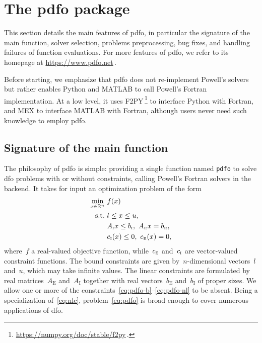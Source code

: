 \documentclass[manuscript,screen,review]{acmart}
\numberwithin{equation}{section}
\newcommand*{\R}{\mathbb{R}}
\newcommand*{\aeq}{A_{\scriptscriptstyle\text{E}}}
\newcommand*{\aub}{A_{\scriptscriptstyle\text{I}}}
\newcommand*{\beq}{b_{\scriptscriptstyle\text{E}}}
\newcommand*{\bub}{b_{\scriptscriptstyle\text{I}}}
\newcommand*{\ceq}{\con[\scriptscriptstyle\text{E}]}
\newcommand*{\con}[1][i]{c\ifthenelse{\equal{#1}{}}{}{_{#1}}}
\newcommand*{\cub}{\con[\scriptscriptstyle\text{I}]}
\newcommand*{\obj}{f}
\newcommand*{\pdfofun}{\texttt{pdfo}\xspace}
\newcommand*{\st}{\text{s.t.}}
\newcommand*{\xl}{l}
\newcommand*{\xu}{u}
\begin{document}
\section{The \gls{pdfo} package}
\label{sec:pdfo}

This section details the main features of \gls{pdfo}, in particular the signature of the main function, solver selection, problems preprocessing, bug fixes, and handling failures of function evaluations.
For more features of \gls{pdfo}, we refer to its homepage at \url{https://www.pdfo.net}\,.

Before starting, we emphasize that \gls{pdfo} does not re-implement Powell's solvers but rather enables Python and MATLAB to call Powell's Fortran implementation.
At a low level, it uses F2PY\,\footnote{\url{https://numpy.org/doc/stable/f2py}\,.} to interface Python with Fortran, and MEX to interface MATLAB with Fortran, although users never need such knowledge to employ \gls{pdfo}.

\subsection{Signature of the main function}

The philosophy of \gls{pdfo} is simple: providing a single function named \pdfofun to solve \gls{dfo} problems with or without constraints, calling Powell's Fortran solvers in the backend.
It takes for input an optimization problem of the form
\begin{subequations}
    \label{eq:pdfo}
    \begin{align}
        \min_{x \in \R^n}   & ~ \obj(x)\\
        \st                 & ~ \xl \le x \le \xu, \label{eq:pdfo-b}\\
                            & ~ \aub x \le \bub, ~ \aeq x = \beq, \label{eq:pdfo-l}\\
                            & ~ \cub(x) \le 0, ~ \ceq(x) = 0, \label{eq:pdfo-nl}
    \end{align}
\end{subequations}
where~$\obj$ a real-valued objective function, while~$\ceq$ and~$\cub$ are vector-valued constraint functions.
The bound constraints are given by~$n$-dimensional vectors~$\xl$ and~$\xu$, which may take infinite values.
The linear constraints are formulated by real matrices~$\aeq$ and~$\aub$ together with real vectors~$\beq$ and~$\bub$ of proper sizes.
We allow one or more of the constraints~\eqref{eq:pdfo-b}--\eqref{eq:pdfo-nl} to be absent.
Being a specialization of~\eqref{eq:nlc}, problem~\eqref{eq:pdfo} is broad enough to cover numerous applications of \gls{dfo}.
\end{document}
